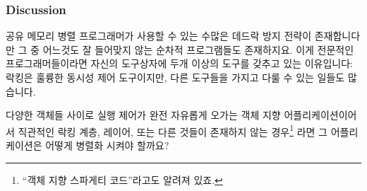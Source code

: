 \subsubsection{Discussion}
\label{sec:locking:Locking Hierarchy Discussion}

공유 메모리 병렬 프로그래머가 사용할 수 있는 수많은 데드락 방지 전략이
존재합니다만 그 중 어느것도 잘 들어맞지 않는 순차적 프로그램들도 존재하지요.
이게 전문적인 프로그래머들이라면 자신의 도구상자에 두개 이상의 도구를 갖추고
있는 이유입니다: 락킹은 훌륭한 동시성 제어 도구이지만, 다른 도구들을 가지고
다룰 수 있는 일들도 많습니다.

\QuickQuiz{}
	다양한 객체들 사이로 실행 제어가 완전 자유롭게 오가는 객체 지향
	어플리케이션이어서 직관적인 락킹 계층, 레이어, 또는 다른 것들이
	존재하지 않는 경우\footnote{
		``객체 지향 스파게티 코드''라고도 알려져 있죠.}
	라면 그 어플리케이션은 어떻게 병렬화 시켜야 할까요?
	\iffalse

